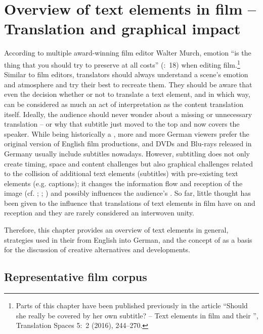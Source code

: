 \chapter{{Overview of text elements in film – Translation and graphical impact}}\label{overview}


According to multiple award-winning film editor Walter Murch, emotion “is the thing that you should try to preserve at all costs” (\citealt{murch2001}:~18) when editing film.\footnote{Parts of this chapter have been published previously in the article “Should she really be covered by her own subtitle? – Text elements in film and their ”, Translation Spaces 5:~2 (2016), 244--270.} Similar to film editors, translators should always understand a scene’s emotion and atmosphere and try their best to recreate them. They should be aware that even the decision whether or not to translate a text element, and in which way, can be considered as much an act of interpretation as the content translation itself. Ideally, the audience should never wonder about a missing or unnecessary translation – or why that subtitle just moved to the top and now covers the speaker. While being historically a , more and more German viewers prefer the original version of English film productions, and DVDs and Blu-rays released in Germany usually include subtitles nowadays. However, subtitling does not only create timing, space and content challenges but also graphical challenges related to the collision of additional text elements (subtitles) with pre-existing text elements (e.g. captions); it changes the information flow and reception of the image (cf. \citealt{rayner2001}; \citealt{Caffrey2009}; \citealt{romero-fresco2013}) and possibly influences the audience’s . So far, little thought has been given to the influence that translations of text elements in film have on  and reception and they are rarely considered an interwoven unity.

Therefore, this chapter provides an overview of text elements in general, strategies used in their  from English into German, and the concept of  as a basis for the discussion of creative alternatives and developments.

\section{Representative film corpus}\label{sec:2.1}


